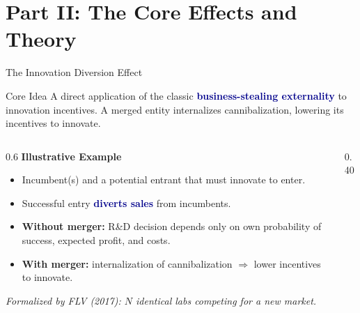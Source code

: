 \documentclass[10pt, aspectratio=169]{beamer}
\newcommand{\highlight}[1]{\textcolor{darkblue}{\textbf{#1}}}
\begin{document}
\section{Part II: The Core Effects and Theory}


\begin{frame}{The Innovation Diversion Effect}
\small
\begin{block}{Core Idea}
A direct application of the classic \highlight{business-stealing externality} to innovation incentives. A merged entity internalizes cannibalization, lowering its incentives to innovate.
\end{block}
\vspace{0.2em}
\begin{columns}[T,onlytextwidth]
\begin{column}{0.6\textwidth}
\textbf{Illustrative Example}
\begin{itemize}
    \setlength{\itemsep}{0.15em}
    \item Incumbent(s) and a potential entrant that must innovate to enter.
    \item Successful entry \highlight{diverts sales} from incumbents.
    \item \textbf{Without merger:} R\&D decision depends only on own probability of success, expected profit, and costs.
    \item \textbf{With merger:} internalization of cannibalization $\Rightarrow$ lower incentives to innovate.
\end{itemize}
\vspace{0.3em}
{\footnotesize\textit{Formalized by FLV (2017): $N$ identical labs competing for a new market.}}
\end{column}
\begin{column}{0.40\textwidth}
\centering
{}
\end{column}
\end{columns}
\end{frame}
\end{document}
